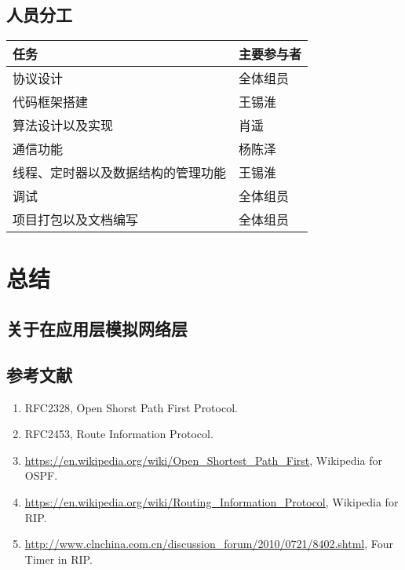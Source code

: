 \documentclass[15pt]{ctexart}
\begin{document}
	\subsection{人员分工} %
	\label{sub:人员分工}
		\begin{table}[H]
			\centering
			\begin{tabular}{|l|l|}
				\hline
				任务 & 主要参与者 \\
				\hline
				协议设计 & 全体组员 \\
				\hline
				代码框架搭建 & 王锡淮 \\
				\hline
				算法设计以及实现 & 肖遥 \\
				\hline
				通信功能 & 杨陈泽 \\
				\hline
				线程、定时器以及数据结构的管理功能 & 王锡淮\\
				\hline 
				调试 & 全体组员 \\
				\hline
				项目打包以及文档编写 & 全体组员\\
				\hline
			\end{tabular}
		\end{table}

\section{总结} %
\label{sec:总结}
	\subsection{关于在应用层模拟网络层} %
	\label{sub:关于在应用层模拟网络层协议}
	




\newpage
\begin{appendices}
    \section{参考文献} %
        \begin{enumerate}
        \item RFC2328, Open Shorst Path First Protocol.
        \item RFC2453, Route Information Protocol.
        \item \url{https://en.wikipedia.org/wiki/Open_Shortest_Path_First}, Wikipedia for OSPF.
        \item \url{https://en.wikipedia.org/wiki/Routing_Information_Protocol}, Wikipedia for RIP.
        \item \url{http://www.clnchina.com.cn/discussion_forum/2010/0721/8402.shtml}, Four Timer in RIP.
        \end{enumerate}
\end{appendices}
\end{document}
